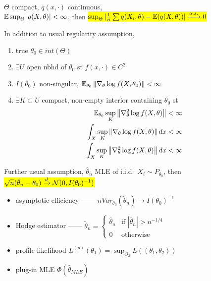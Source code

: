 \begin{thm}
    $\Theta$ compact, $q(x, \cdot)$ continuous,\\ $\mathbb{E}\sup_\Theta|q(X, \theta)| < \infty$, then
    \hl{$\sup_\Theta |\frac{1}{n} \sum q(X_i, \theta) - \mathbb{E}(q(X, \theta))| \xrightarrow{a.s.} 0 $}
\end{thm}

\begin{assumption}
    In addition to usual regularity assumption,
    \begin{enumerate}
        \item true $\theta_0 \in int(\Theta)$
        \item $\exists U$ open nbhd of $\theta_0$ st $f(x, \cdot) \in C^2$
        \item $I(\theta_0)$ non-singular, $\mathbb{E}_{\theta_0}\left\lVert\nabla_\theta \log f(X, \theta_0)\right\rVert < \infty$
        \item $\exists K \subset U$ compact, non-empty interior containing $\theta_0$ st
        \begin{align*}
            \mathbb{E}_{\theta_0}\sup_K \left\lVert\nabla^2_\theta \log f(X, \theta)\right\rVert < \infty \\
            \int_X \sup_K \left\lVert\nabla_\theta \log f(X, \theta)\right\rVert dx < \infty\\
            \int_X \sup_K \left\lVert\nabla^2_\theta \log f(X, \theta)\right\rVert dx < \infty
        \end{align*}
    \end{enumerate}
\end{assumption}

\begin{thm}
    Further usual assumption, $\hat{\theta}_n$ MLE of i.i.d.\ $X_i \sim P_{\theta_0}$, then\\
    \hl{$\sqrt{n}(\hat{\theta}_n - \theta_0) \xrightarrow{d} \mathcal{N}(0, I(\theta_0)^{-1})$}
\end{thm}

\begin{itemize}
    \item asymptotic efficiency ------ $n Var_{\theta_0}(\tilde \theta_n) \rightarrow I(\theta_0)^{-1}$
    \item Hodge estimator ------ $\tilde \theta_n = \begin{cases}
                                                        \hat \theta_n & \text{if } |\hat \theta_n| > n^{-1/4}\\
                                                        0 & \text{otherwise}
    \end{cases}$
    \item profile likelihood $L^{(p)}(\theta_1) = \sup_{\Theta_2} L((\theta_1, \theta_2))$
    \item plug-in MLE $\Phi(\hat \theta_{MLE})$
\end{itemize}

